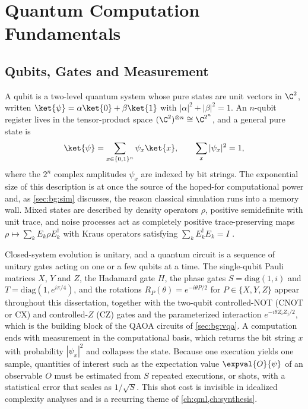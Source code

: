 \section{Quantum Computation Fundamentals}\label{sec:bg:qc}

\subsection{Qubits, Gates and Measurement}

A qubit is a two-level quantum system whose pure states are unit vectors in $\C^2$, written $\ket{\psi}=\alpha\ket{0}+\beta\ket{1}$ with $|\alpha|^2+|\beta|^2=1$. An $n$-qubit register lives in the tensor-product space $(\C^2)^{\otimes n}\cong\C^{2^n}$, and a general pure state is
\begin{equation}\label{eq:bg:statevector}
\ket{\psi}=\sum_{x\in\{0,1\}^n}\psi_x\ket{x},\qquad \sum_{x}|\psi_x|^2=1,
\end{equation}
where the $2^n$ complex amplitudes $\psi_x$ are indexed by bit strings. The exponential size of this description is at once the source of the hoped-for computational power and, as \cref{sec:bg:sim} discusses, the reason classical simulation runs into a memory wall. Mixed states are described by density operators $\rho$, positive semidefinite with unit trace, and noise processes act as completely positive trace-preserving maps $\rho\mapsto\sum_k E_k\rho E_k^\dagger$ with Kraus operators satisfying $\sum_k E_k^\dagger E_k=I$ \cite{nielsen2010qcqi}.

Closed-system evolution is unitary, and a quantum circuit is a sequence of unitary gates acting on one or a few qubits at a time. The single-qubit Pauli matrices $X$, $Y$ and $Z$, the Hadamard gate $H$, the phase gates $S=\mathrm{diag}(1,i)$ and $T=\mathrm{diag}(1,e^{i\pi/4})$, and the rotations $R_P(\theta)=e^{-i\theta P/2}$ for $P\in\{X,Y,Z\}$ appear throughout this dissertation, together with the two-qubit controlled-NOT (CNOT or CX) and controlled-$Z$ (CZ) gates and the parameterized interaction $e^{-i\theta Z_iZ_j/2}$, which is the building block of the QAOA circuits of \cref{sec:bg:vqa}. A computation ends with measurement in the computational basis, which returns the bit string $x$ with probability $|\psi_x|^2$ and collapses the state. Because one execution yields one sample, quantities of interest such as the expectation value $\expval{O}{\psi}$ of an observable $O$ must be estimated from $S$ repeated executions, or shots, with a statistical error that scales as $1/\sqrt{S}$. This shot cost is invisible in idealized complexity analyses and is a recurring theme of \cref{ch:qml,ch:synthesis}.

